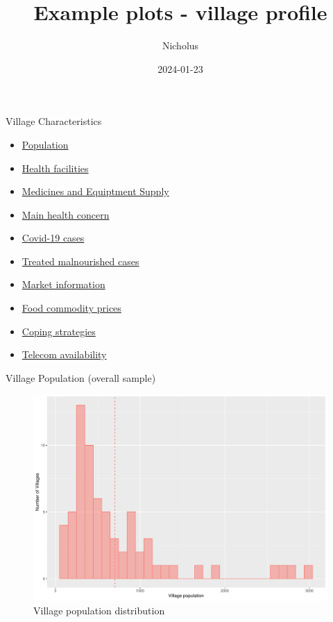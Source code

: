 \documentclass[
  ignorenonframetext,
]{beamer}
\title{Example plots - village profile}
\author{Nicholus}
\date{2024-01-23}
\providecommand{\tightlist}{%
  \setlength{\itemsep}{0pt}\setlength{\parskip}{0pt}}
\begin{document}
\frame{\titlepage}

\begin{frame}{Village Characteristics}
\protect\hypertarget{village-characteristics}{}
\begin{itemize}
\tightlist
\item
  \protect\hyperlink{pop}{Population}
\item
  \protect\hyperlink{hfc}{Health facilities}
\item
  \protect\hyperlink{equiptment}{Medicines and Equiptment Supply}
\item
  \protect\hyperlink{healthconcern}{Main health concern}
\item
  \protect\hyperlink{covid}{Covid-19 cases}
\item
  \protect\hyperlink{malnut}{Treated malnourished cases}
\item
  \protect\hyperlink{markets}{Market information}
\item
  \protect\hyperlink{foodprices}{Food commodity prices}
\item
  \protect\hyperlink{vthccsi}{Coping strategies}
\item
  \protect\hyperlink{telecon}{Telecom availability}
\end{itemize}
\end{frame}

\begin{frame}{Village Population (overall sample)}
\protect\hypertarget{pop}{}
\begin{figure}
\includegraphics[width=1\linewidth]{example_plots_files/figure-beamer/unnamed-chunk-2-1} \caption{Village population distribution}\label{fig:unnamed-chunk-2}
\end{figure}
\end{frame}
\end{document}
